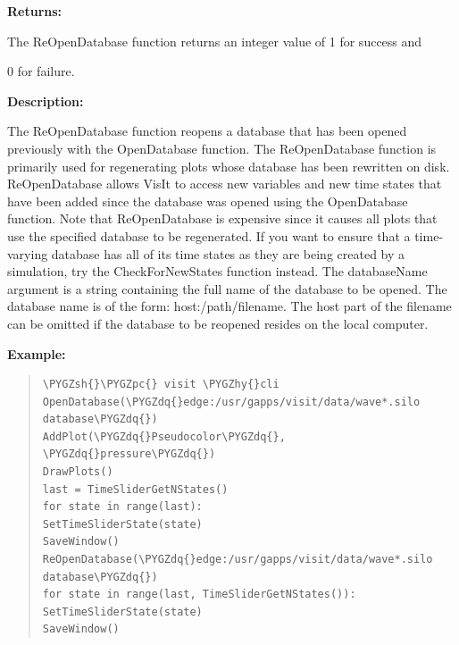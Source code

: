 \documentclass[letterpaper,10pt,english]{sphinxmanual}
\def\PYGZsh{\char`\#}
\def\PYGZpc{\char`\%}
\def\PYGZhy{\char`\-}
\def\PYGZdq{\char`\"}
\begin{document}
\begin{DUlineblock}{0em}
\item[] 
\item[] \textbf{Returns:}
\item[] The ReOpenDatabase function returns an integer value of 1 for success and
\item[] 0 for failure.
\item[] 
\item[] \textbf{Description:}
\item[] The ReOpenDatabase function reopens a database that has been opened
previously with the OpenDatabase function. The ReOpenDatabase function is
primarily used for regenerating plots whose database has been rewritten on
disk. ReOpenDatabase allows VisIt to access new variables and new time
states that have been added since the database was opened using the
OpenDatabase function. Note that ReOpenDatabase is expensive since it
causes all plots that use the specified database to be regenerated. If you
want to ensure that a time-varying database has all of its time states as
they are being created by a simulation, try the CheckForNewStates function
instead.
The databaseName argument is a string containing the full name of the
database to be opened. The database name is of the form:
host:/path/filename. The host part of the filename can be omitted if the
database to be reopened resides on the local computer.
\end{DUlineblock}

\begin{DUlineblock}{0em}
\item[] 
\end{DUlineblock}

\begin{DUlineblock}{0em}
\item[] \textbf{Example:}
\item[] 
\end{DUlineblock}
\begin{quote}

\begin{Verbatim}[commandchars=\\\{\}]
\PYGZsh{}\PYGZpc{} visit \PYGZhy{}cli
OpenDatabase(\PYGZdq{}edge:/usr/gapps/visit/data/wave*.silo database\PYGZdq{})
AddPlot(\PYGZdq{}Pseudocolor\PYGZdq{}, \PYGZdq{}pressure\PYGZdq{})
DrawPlots()
last = TimeSliderGetNStates()
for state in range(last):
SetTimeSliderState(state)
SaveWindow()
ReOpenDatabase(\PYGZdq{}edge:/usr/gapps/visit/data/wave*.silo database\PYGZdq{})
for state in range(last, TimeSliderGetNStates()):
SetTimeSliderState(state)
SaveWindow()
\end{Verbatim}
\end{quote}
\end{document}
